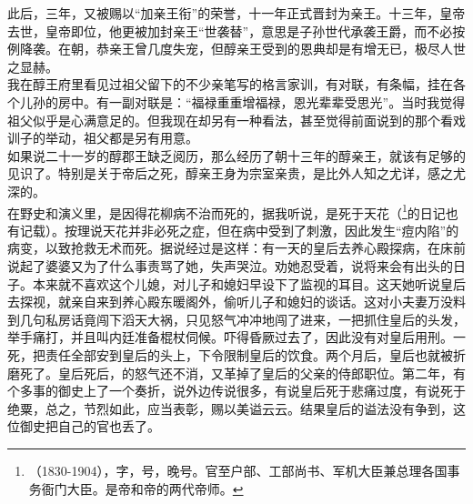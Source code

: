 此后，三年，又被赐以“加亲王衔”的荣誉，十一年正式晋封为亲王。十三年，皇帝去世，皇帝即位，他更被加封亲王“世袭替”，意思是子孙世代承袭王爵，而不必按例降袭。在朝，恭亲王曾几度失宠，但醇亲王受到的恩典却是有增无已，极尽人世之显赫。\\

我在醇王府里看见过祖父留下的不少亲笔写的格言家训，有对联，有条幅，挂在各个儿孙的房中。有一副对联是：“福禄重重增福禄，恩光辈辈受思光”。当时我觉得祖父似乎是心满意足的。但我现在却另有一种看法，甚至觉得前面说到的那个看戏训子的举动，祖父都是另有用意。\\

如果说二十一岁的醇郡王缺乏阅历，那么经历了朝十三年的醇亲王，就该有足够的见识了。特别是关于帝后之死，醇亲王身为宗室亲贵，是比外人知之尤详，感之尤深的。\\

在野史和演义里，是因得花柳病不治而死的，据我听说，是死于天花（\footnote{（1830-1904），字，号，晚号。官至户部、工部尚书、军机大臣兼总理各国事务衙门大臣。是帝和帝的两代帝师。}的日记也有记载）。按理说天花并非必死之症，但在病中受到了刺激，因此发生“痘内陷”的病变，以致抢救无术而死。据说经过是这样：有一天的皇后去养心殿探病，在床前说起了婆婆又为了什么事责骂了她，失声哭泣。劝她忍受着，说将来会有出头的日子。本来就不喜欢这个儿媳，对儿子和媳妇早设下了监视的耳目。这天她听说皇后去探视，就亲自来到养心殿东暖阁外，偷听儿子和媳妇的谈话。这对小夫妻万没料到几句私房话竟闯下滔天大祸，只见怒气冲冲地闯了进来，一把抓住皇后的头发，举手痛打，并且叫内廷准备棍杖伺候。吓得昏厥过去了，因此没有对皇后用刑。一死，把责任全部安到皇后的头上，下令限制皇后的饮食。两个月后，皇后也就被折磨死了。皇后死后，的怒气还不消，又革掉了皇后的父亲的侍郎职位。第二年，有个多事的御史上了一个奏折，说外边传说很多，有说皇后死于悲痛过度，有说死于绝粟，总之，节烈如此，应当表彰，赐以美谥云云。结果皇后的谥法没有争到，这位御史把自己的官也丢了。\\

